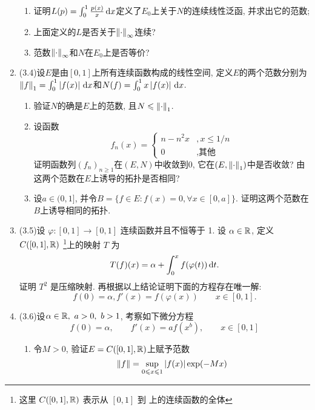 \begin{enumerate}[label=\textbf{\arabic*.}, ref=\arabic*]
\begin{enumerate}[(1)]
        \item 证明$ L(p)=\int_0^1\frac{p(x)}{x}\,\mathrm{d} x $定义了$ E_0 $上关于$ N $的连续线性泛函, 并求出它的范数;
        \item 上面定义的$ L $是否关于$ \left\| \cdot \right\|_\infty $连续?
        \item 范数$ \left\| \cdot \right\|_\infty $和$ N $在$ E_0 $上是否等价? 
        \end{enumerate}
    \item (3.4)设$ E $是由$ [0,1] $上所有连续函数构成的线性空间, 定义$ E $的两个范数分别为$ \left\| f \right\|_1=\int_0^1\left| f(x) \right| \,\mathrm{d} x $和$ N(f)=\int_0^1x\left| f(x) \right| \,\mathrm{d} x $.
        \begin{enumerate}[(1)]
        \item 验证$ N $的确是$ E $上的范数, 且$ N\leqslant\left\| \cdot \right\|_1 $.
        \item 设函数
        \[
        f_n(x)=\begin{cases}
        n-n^2x & ,x\leqslant 1/n\\
        0 & ,\text{其他}
        \end{cases}
        \]
        证明函数列$ (f_n)_{n\geqslant 1} $在$ (E,N) $中收敛到0, 它在$ (E,\left\| \cdot \right\|_1) $中是否收敛? 由这两个范数在$ E $上诱导的拓扑是否相同?
        \item 设$ a\in(0,1] $, 并令$ B=\{ f\in E : f(x)=0, \forall x\in[0,a] \} $. 证明这两个范数在$ B $上诱导相同的拓扑. 
        \end{enumerate}
    \item (3.5)设 $ \varphi:[0, 1]\to [0, 1] $ 连续函数并且不恒等于 1. 设 $ \alpha\in\mathbb{R} $, 定义 $ C([0, 1],\mathbb{R}) $ \footnote{这里 $ C([0, 1],\mathbb{R}) $ 表示从 $ [0, 1] $ 到 \R 上的连续函数的全体 }上的映射 $ T $ 为
        \[
            T(f)(x)=\alpha+\int_{0}^{x}f(\varphi(t))\,\mathrm{d} t.
        \]
        证明 $ T^2 $ 是压缩映射. 再根据以上结论证明下面的方程存在唯一解: 
        \begin{equation}
            f(0)=\alpha, f'(x)=f(\varphi(x))\qquad x\in[0, 1].
        \end{equation}
    \item (3.6)设$ \alpha\in\R,\ a>0,\ b>1 $, 考察如下微分方程
        \begin{equation}
        f(0)=\alpha,\qquad f'(x)=af(x^b),\qquad x\in[0,1]
        \end{equation}
        \begin{enumerate}[(1)]
        \item 令$ M>0 $, 验证$ E=C([0,1],\mathbb{R}) $上赋予范数
        \[
        \left\| f \right\|=\sup_{0\leqslant x\leqslant 1}\left| f(x) \right| \exp(-Mx)
\]
\end{enumerate}
\end{enumerate}
